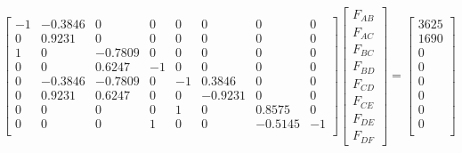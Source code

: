\begin{fullwidth}
\begin{equation}
\left[
\begin{matrix}
-1 & -0.3846 & 0 & 0 & 0 & 0 & 0 & 0 \\
0 & 0.9231 & 0 & 0 & 0 & 0 & 0 & 0 \\
1 & 0 & -0.7809 & 0 & 0 & 0 & 0 & 0 \\
0 & 0 & 0.6247 & -1 & 0 & 0 & 0 & 0 \\
0 & -0.3846 & -0.7809 & 0 & -1 & 0.3846 & 0 & 0 \\
0 & 0.9231 & 0.6247 & 0 & 0 & -0.9231 & 0 & 0 \\ 
0 & 0 & 0 & 0 & 1 & 0 & 0.8575 & 0 \\
0 & 0 & 0 & 1 & 0 & 0 & -0.5145 & - 1 \\
\end{matrix}
\right]
\left[
\begin{matrix}
F_{AB} \\
F_{AC} \\
F_{BC} \\
F_{BD} \\
F_{CD} \\
F_{CE} \\
F_{DE} \\
F_{DF} 
\end{matrix}
\right]
=
\left[
\begin{matrix}
3625 \\
1690 \\
0 \\
0 \\
0 \\
0 \\
0 \\
0 \\
\end{matrix}
\right]
\label{eq:lec7n-truss-soe}
\end{equation}
\end{fullwidth}

